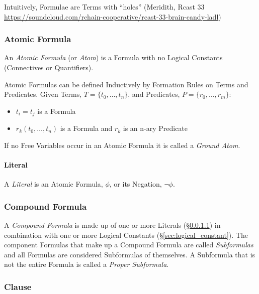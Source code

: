 Intuitively, Formulae are Terms with ``holes'' (Meridith, Rcast 33
\url{https://soundcloud.com/rchain-cooperative/rcast-33-brain-candy-ladl})



\subsubsection{Atomic Formula}\label{sec:atomic_formula}

An \emph{Atomic Formula} (or \emph{Atom}) is a Formula with no Logical
Constants (Connectives or Quantifiers).

Atomic Formulas can be defined Inductively by Formation Rules on Terms
and Predicates. Given Terms, $T = \{t_0,\ldots,t_n\}$, and Predicates,
$P = \{r_0,\ldots,r_m\}$:
\begin{itemize}
  \item $t_i = t_j$ is a Formula
  \item $r_k(t_0,\ldots,t_n)$ is a Formula and $r_k$ is an n-ary
    Predicate
\end{itemize}
If no Free Variables occur in an Atomic Formula it is called a
\emph{Ground Atom}.



\paragraph{Literal}\label{sec:literal}\hfill

A \emph{Literal} is an Atomic Formula, $\phi$, or its Negation, $\neg
\phi$.



\subsubsection{Compound Formula}\label{sec:compound_formula}

A \emph{Compound Formula} is made up of one or more Literals
(\S\ref{sec:literal}) in combination with one or more Logical
Constants (\S\ref{sec:logical_constant}). The component Formulas that
make up a Compound Formula are called \emph{Subformulas} and all
Formulas are considered Subformulas of themselves. A Subformula that
is not the entire Formula is called a \emph{Proper Subformula}.



\subsubsection{Clause}\label{sec:clause}

